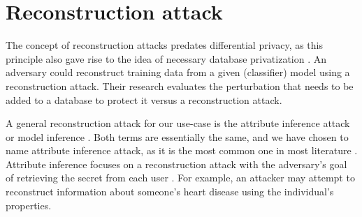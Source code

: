 
\newpage
\section{Reconstruction attack}
The concept of reconstruction attacks predates differential privacy, as this principle also gave rise to the idea of necessary database privatization \citep{dinur_revealing_2003}.
An adversary could reconstruct training data from a given (classifier) model using a reconstruction attack.
Their research evaluates the perturbation that needs to be added to a database to protect it versus a reconstruction attack.

A general reconstruction attack for our use-case is the attribute inference attack \citep{dwork_exposed_2017} or model inference \citep{rigaki_survey_2021}.
Both terms are essentially the same, and we have chosen to name attribute inference attack, as it is the most common one in most literature \citep{jegorova_survey_2022}.
Attribute inference focuses on a reconstruction attack with the adversary's goal of retrieving the secret from each user \citep{dwork_exposed_2017}.
For example, an attacker may attempt to reconstruct information about someone's heart disease using the individual's properties.

